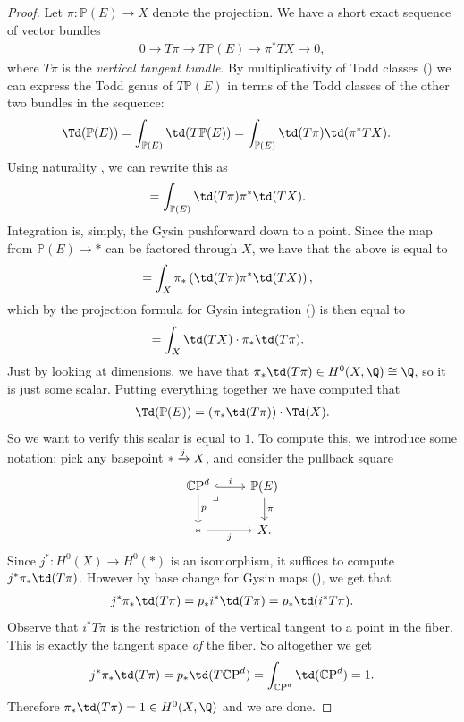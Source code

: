\documentclass[11pt]{book}
\begin{document}
\begin{proof} Let $\pi \colon \mathbb{P}(E) \to X$ denote the projection. We have a short exact sequence of vector bundles
\begin{align*}
    0 \to T\pi \to T \mathbb{P}(E) \to \pi^\ast TX \to 0,
\end{align*}
where $T\pi$ is the \emph{vertical tangent bundle}. By multiplicativity of Todd classes () we can express the Todd genus of $T \mathbb{P}(E)$ in terms of the Todd classes of the other two bundles in the sequence:
\begin{align*}
    \Td(\mathbb{P}(E)) &= \int_{\mathbb{P}(E)} \td(T \mathbb{P}(E)) = \int_{\mathbb{P}(E)} \td(T\pi) \td(\pi^\ast TX).
\end{align*}
Using naturality , we can rewrite this as
\begin{align*}
    &= \int_{\mathbb{P}(E)} \td(T\pi) \pi^\ast \td(TX).
\end{align*}
Integration is, simply, the Gysin pushforward down to a point. Since the map from $\mathbb{P}(E) \to \ast$ can be factored through $X$, we have that the above is equal to
\begin{align*}
    &=\int_X \pi_\ast \left( \td(T\pi) \pi^\ast \td(TX) \right),
\end{align*}
which by the projection formula for Gysin integration () is then equal to
\begin{align*}
    &= \int_X  \td(TX) \cdot \pi_\ast \td(T\pi).
\end{align*}
Just by looking at dimensions, we have that $\pi_\ast \td(T\pi) \in H^0(X,\Q) \cong \Q$, so it is just some scalar. Putting everything together we have computed that
\begin{align*}
    \Td(\mathbb{P}(E)) = (\pi_\ast \td(T\pi))\cdot \Td(X).
\end{align*}
So we want to verify this scalar is equal to $1$. To compute this, we introduce some notation: pick any basepoint $\ast \xrightarrow{j} X$, and consider the pullback square
\[ \begin{tikzcd}
    \CP^{d}\rar[hook,"i" above]\dar["p"]\pb & \mathbb{P}(E)\dar["\pi" right]\\
    \ast\rar["j" below] & X.
\end{tikzcd} \]
Since $j^\ast \colon H^0(X) \to H^0(\ast)$ is an isomorphism, it suffices to compute $j^\ast \pi_\ast \td(T\pi)$. However by base change for Gysin maps (), we get that
\begin{align*}
    j^\ast \pi_\ast \td(T\pi) = p_\ast i^\ast \td(T\pi) = p_\ast \td(i^\ast T\pi).
\end{align*}
Observe that $i^\ast T\pi$ is the restriction of the vertical tangent to a point in the fiber. This is exactly the tangent space \emph{of} the fiber. So altogether we get
\begin{align*}
    j^\ast \pi_\ast \td(T\pi) = p_\ast \td(T\CP^d) = \int_{\CP^d}\td(\CP^d) = 1.
\end{align*}
Therefore $\pi_\ast \td(T\pi) = 1 \in H^0(X,\Q)$ and we are done.
\end{proof}
\end{document}
